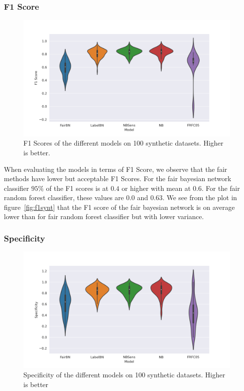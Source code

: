 \subsubsection{F1 Score}

\begin{figure}
    \centering
    \includegraphics[width=\linewidth]{figures/F1score-synthethic.png}
    \caption{F1 Scores of the different models on 100 synthetic datasets. Higher is better.}
    \label{fig:f1synth}
\end{figure}

When evaluating the models in terms of F1 Score, we observe that the fair methods have lower but acceptable F1 Scores. For the fair bayesian network classifier $95\%$ of the F1 scores is at $0.4$ or higher with mean at $0.6$. For the fair random forest classifier, these values are $0.0$ and $0.63$. We see from the plot in figure~\ref{fig:f1synt} that the F1 score of the fair bayesian network is on average lower than for fair random forest classifier but with lower variance.

\subsubsection{Specificity}

\begin{figure}
    \centering
    \includegraphics[width=\linewidth]{figures/Specificity-synthetic.png}
    \caption{Specificity of the different models on 100 synthetic datasets. Higher is better}
    \label{fig:specsynth}
\end{figure}

